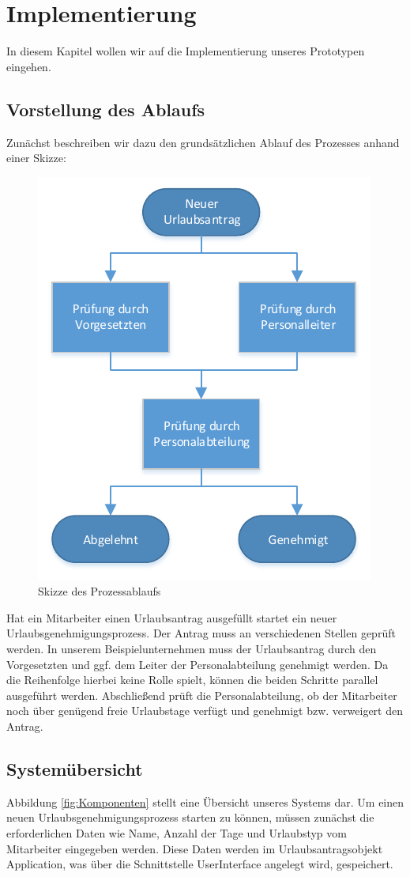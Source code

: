 \section{Implementierung}
In diesem Kapitel wollen wir auf die Implementierung unseres Prototypen eingehen.


\subsection{Vorstellung des Ablaufs}
Zunächst beschreiben wir dazu den grundsätzlichen Ablauf des Prozesses anhand einer Skizze:
\begin{figure}[H]
\centering
\includegraphics[width=0.5\linewidth]{Bilder/Workflow}
\caption{Skizze des Prozessablaufs}
\label{fig:Workflow}
\end{figure}

Hat ein Mitarbeiter einen Urlaubsantrag ausgefüllt startet ein neuer Urlaubsgenehmigungsprozess. Der Antrag muss an verschiedenen Stellen geprüft werden. In unserem Beispielunternehmen muss der Urlaubsantrag durch den Vorgesetzten und ggf. dem Leiter der Personalabteilung genehmigt werden. Da die Reihenfolge hierbei keine Rolle spielt, können die beiden Schritte parallel ausgeführt werden. Abschließend prüft die Personalabteilung, ob der Mitarbeiter noch über genügend freie Urlaubstage verfügt und genehmigt bzw. verweigert den Antrag.	
	
	
\subsection{Systemübersicht}
Abbildung \ref{fig:Komponenten} stellt eine Übersicht unseres Systems dar. Um einen neuen Urlaubsgenehmigungsprozess starten zu können, müssen zunächst die erforderlichen Daten wie Name, Anzahl der Tage und Urlaubstyp vom Mitarbeiter eingegeben werden. Diese Daten werden im Urlaubsantragsobjekt Application, was über die Schnittstelle UserInterface angelegt wird, gespeichert.

